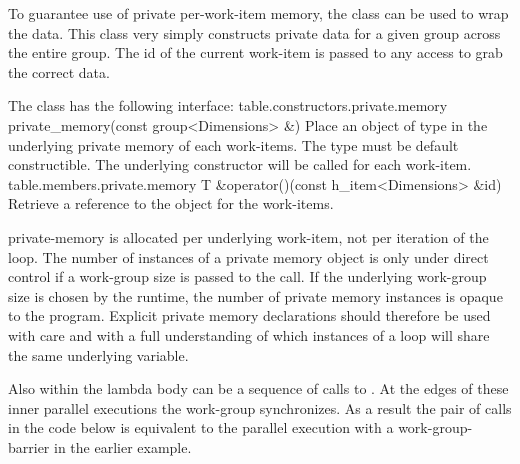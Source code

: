 To guarantee use of private per-work-item memory, the
 class can be used to wrap the data.
This class very simply constructs private data for a given group across the
entire group. The id of the current work-item is passed to any access
to grab the correct data.

The  class has the following interface:
\label{paragraph.private.memory}
{table.constructors.private.memory}
  \addRow
    {private_memory(const group<Dimensions> \&)}
    {
      Place an object of type  in the underlying private memory of each \glspl{work-item}.
      The type  must be default constructible.
      The underlying constructor will be called for each \gls{work-item}.
    }
\completeTable
{table.members.private.memory}
  \addRow
    {T \&operator()(const h_item<Dimensions> \&id)}
    {
      Retrieve a reference to the object for the \glspl{work-item}.
    }
\completeTable

\Gls{private-memory} is allocated per underlying \gls{work-item}, not per
iteration of the  loop. The number
of instances of a private memory object is only under direct control
if a work-group size is passed to the
 call. If the underlying
work-group size is chosen by the runtime, the number of private memory
instances is opaque to the program. Explicit private memory
declarations should therefore be used with care and with a full
understanding of which instances of a
 loop will share the same
underlying variable.

Also within the lambda body can be a sequence of calls to
. At the edges of these inner
parallel executions the work-group synchronizes. As a result the pair
of  calls in the code below is
equivalent to the parallel execution with a \gls{work-group-barrier} in the earlier example.


